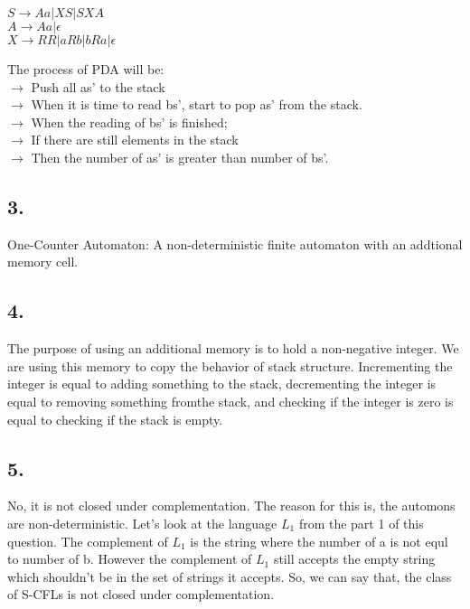 \documentclass[12pt]{article}
\begin{document}
\begin{center}
		$S \rightarrow Aa | XS | SXA$\\ 
		$A \rightarrow Aa | \epsilon$\\
		$X \rightarrow RR | aRb | bRa | \epsilon$\\
\end{center}

The process of PDA will be:\\

$\rightarrow$ Push all as' to the stack\\
$\rightarrow$ When it is time to read bs', start to pop as' from the stack.\\
$\rightarrow$ When the reading of bs' is finished;\\
$\rightarrow$ If there are still elements in the stack\\
$\rightarrow$ Then the number of as' is greater than number of bs'.\\

\subsection*{3.}  

One-Counter Automaton: A non-deterministic finite automaton with an addtional memory cell.\\

\subsection*{4.}  

The purpose of using an additional memory is to hold a non-negative integer. We are using this memory to copy the behavior of stack structure. Incrementing the integer is equal to adding something to the stack, decrementing the integer is equal to removing something fromthe stack, and checking if the integer is zero is equal to checking if the stack is empty.\\



\subsection*{5.}  

No, it is not closed under complementation. The reason for this is, the automons are non-deterministic. Let's look at the language $L_1$ from the part 1 of this question. The complement of $L_1$ is the string where the number of a is not equl to number of b. However the complement of $L_1$ still accepts the empty string which shouldn't be in the set of strings it accepts. So, we can say that, the class
of S-CFLs is not closed under complementation.\\
\end{document}
